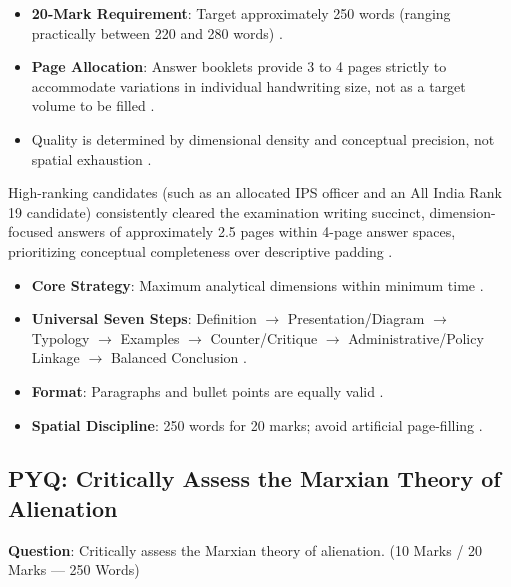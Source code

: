 \begin{DataFact}
\begin{itemize}
    \item \textbf{20-Mark Requirement}: Target approximately 250 words (ranging practically between 220 and 280 words) .
    \item \textbf{Page Allocation}: Answer booklets provide 3 to 4 pages strictly to accommodate variations in individual handwriting size, not as a target volume to be filled .
    \item Quality is determined by dimensional density and conceptual precision, not spatial exhaustion .
\end{itemize}
\end{DataFact}

\begin{ExampleBox}
High-ranking candidates (such as an allocated IPS officer and an All India Rank 19 candidate) consistently cleared the examination writing succinct, dimension-focused answers of approximately 2.5 pages within 4-page answer spaces, prioritizing conceptual completeness over descriptive padding .
\end{ExampleBox}

\begin{QuickRevision}
\begin{itemize}
    \item \textbf{Core Strategy}: Maximum analytical dimensions within minimum time .
    \item \textbf{Universal Seven Steps}: Definition $\rightarrow$ Presentation/Diagram $\rightarrow$ Typology $\rightarrow$ Examples $\rightarrow$ Counter/Critique $\rightarrow$ Administrative/Policy Linkage $\rightarrow$ Balanced Conclusion .
    \item \textbf{Format}: Paragraphs and bullet points are equally valid .
    \item \textbf{Spatial Discipline}: 250 words for 20 marks; avoid artificial page-filling .
\end{itemize}
\end{QuickRevision}

\subsection{PYQ: Critically Assess the Marxian Theory of Alienation}

\begin{PYQLink}
\textbf{Question}: Critically assess the Marxian theory of alienation. (10 Marks / 20 Marks --- 250 Words) 
\end{PYQLink}

